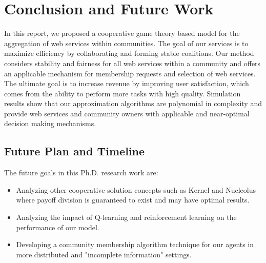 \setcounter{chapter}{3}
\chapter{Conclusion and Future Work}\label{sec:conclusionfuturework}

In this report, we proposed a cooperative game theory based model for the aggregation of web services within communities.
The goal of our services is to maximize efficiency by collaborating and forming stable
coalitions. Our method considers stability and fairness for all
web services within a community and offers an applicable mechanism
for membership requests and selection of web services. The
ultimate goal is to increase revenue by improving user
satisfaction, which comes from the ability to perform more tasks
with high quality. Simulation results show that our approximation
algorithms are polynomial in complexity and provide web services
and community owners with applicable and near-optimal decision
making mechanisms.


\section {Future Plan and Timeline}

\indent The future goals in this Ph.D. research work are:

\begin{itemize}
\item Analyzing other cooperative solution concepts such as Kernel
and Nucleolus where payoff division is guaranteed to exist and may
have optimal results.

\item Analyzing the impact of Q-learning and reinforcement
learning on the performance of our model.

\item Developing a community membership algorithm technique for
our agents in more distributed and "incomplete information" settings.

\end{itemize}


